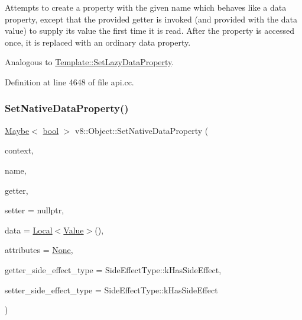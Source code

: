 Attempts to create a property with the given name which behaves like a data property, except that the provided getter is invoked (and provided with the data value) to supply its value the first time it is read. After the property is accessed once, it is replaced with an ordinary data property.

Analogous to \mbox{\hyperlink{classv8_1_1Template_ab306ba858f4e71a25ebba4380ea5791f}{Template\+::\+Set\+Lazy\+Data\+Property}}. 

Definition at line 4648 of file api.\+cc.

\mbox{\label{classv8_1_1Object_a437ba98e4d80b312bd5ee1f920d89eda}} 
\subsubsection{\texorpdfstring{Set\+Native\+Data\+Property()}{SetNativeDataProperty()}}
{\footnotesize\ttfamily \mbox{\hyperlink{classv8_1_1Maybe}{Maybe}}$<$ \mbox{\hyperlink{classbool}{bool}} $>$ v8\+::\+Object\+::\+Set\+Native\+Data\+Property (\begin{DoxyParamCaption}\item[{\mbox{\hyperlink{classv8_1_1Local}{Local}}$<$ Context $>$}]{context,  }\item[{\mbox{\hyperlink{classv8_1_1Local}{v8\+::\+Local}}$<$ \mbox{\hyperlink{classv8_1_1Name}{Name}} $>$}]{name,  }\item[{Accessor\+Name\+Getter\+Callback}]{getter,  }\item[{Accessor\+Name\+Setter\+Callback}]{setter = {\ttfamily nullptr},  }\item[{\mbox{\hyperlink{classv8_1_1Local}{v8\+::\+Local}}$<$ \mbox{\hyperlink{classv8_1_1Value}{Value}} $>$}]{data = {\ttfamily \mbox{\hyperlink{classv8_1_1Local}{Local}}$<$\mbox{\hyperlink{classv8_1_1Value}{Value}}$>$()},  }\item[{\mbox{\hyperlink{namespacev8_a05f25f935e108a1ea2d150e274602b87}{Property\+Attribute}}}]{attributes = {\ttfamily \mbox{\hyperlink{namespacev8_a05f25f935e108a1ea2d150e274602b87a7ab4d58719c33b3ea2dfaefa29b111df}{None}}},  }\item[{\mbox{\hyperlink{namespacev8_a29711319c2b9fc7716d65faee2f7b9cb}{Side\+Effect\+Type}}}]{getter\+\_\+side\+\_\+effect\+\_\+type = {\ttfamily SideEffectType\+:\+:kHasSideEffect},  }\item[{\mbox{\hyperlink{namespacev8_a29711319c2b9fc7716d65faee2f7b9cb}{Side\+Effect\+Type}}}]{setter\+\_\+side\+\_\+effect\+\_\+type = {\ttfamily SideEffectType\+:\+:kHasSideEffect} }\end{DoxyParamCaption})}

